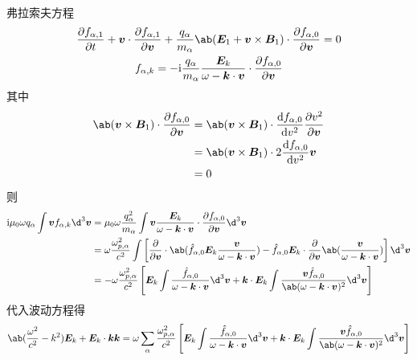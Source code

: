 弗拉索夫方程
\begin{equation}\begin{gathered}
\pdv{f_{\alpha,1}}{t}
+ \vec{v} \cdot \pdv{f_{\alpha,1}}{\vec{v}}
+ \frac{q_\alpha}{m_\alpha} \ab(\vec{E}_1 + \vec{v}\times\vec{B}_1)
\cdot \pdv{f_{\alpha,0}}{\vec{v}}
= 0 \\
f_{\alpha,k} = -\im \frac{q_\alpha}{m_\alpha}
\frac{\vec{E}_k}{\omega - \vec{k}\cdot\vec{v}}
\cdot \pdv{f_{\alpha,0}}{\vec{v}}
\end{gathered}\end{equation}
其中
\begin{equation}\begin{aligned}
\ab(\vec{v} \times \vec{B}_1) \cdot \pdv{f_{\alpha,0}}{\vec{v}}
&= \ab(\vec{v} \times \vec{B}_1)
\cdot \odv{f_{\alpha,0}}{v^2} \pdv{v^2}{\vec{v}} \\
&= \ab(\vec{v} \times \vec{B}_1)
\cdot 2 \odv{f_{\alpha,0}}{v^2} \vec{v} \\
&= 0
\end{aligned}\end{equation}
则
\begin{equation}\begin{aligned}
\im\mu_0\omega q_\alpha \int \vec{v} f_{\alpha,k} \d^3\vec{v}
&= \mu_0\omega \frac{q_\alpha^2}{m_\alpha}
\int \vec{v} \frac{\vec{E}_k}{\omega - \vec{k}\cdot\vec{v}}
\cdot \pdv{f_{\alpha,0}}{\vec{v}} \d^3\vec{v} \\
&= \omega \frac{\omega_{p,\alpha}^2}{c^2} \int \left[
\pdv{}{\vec{v}} \cdot \ab(
    \hat{f}_{\alpha,0} \vec{E}_k
    \frac{\vec{v}}{\omega - \vec{k}\cdot\vec{v}}
)
    - \hat{f}_{\alpha,0} \vec{E}_k \cdot
    \pdv*{\ab(\frac{\vec{v}}{\omega-\vec{k}\cdot\vec{v}})}{\vec{v}}
\right] \d^3\vec{v} \\
&= - \omega \frac{\omega_{p,\alpha}^2}{c^2} \left[
\vec{E}_k \int
\frac{\hat{f}_{\alpha,0}}{\omega - \vec{k}\cdot\vec{v}}
\d^3\vec{v}
+ \vec{k} \cdot \vec{E}_k \int
\frac{\vec{v} \hat{f}_{\alpha,0}}
{\ab(\omega - \vec{k}\cdot\vec{v})^2}
\d^3\vec{v}
\right]
\end{aligned}\end{equation}
代入波动方程得
\begin{equation}\begin{aligned}
\ab(\frac{\omega^2}{c^2} - k^2) \vec{E}_k
+ \vec{E}_k\cdot\vec{k}\vec{k}
= \omega \sum_\alpha \frac{\omega_{p,\alpha}^2}{c^2}
\left[
\vec{E}_k \int
\frac{\hat{f}_{\alpha,0}}{\omega - \vec{k}\cdot\vec{v}}
\d^3\vec{v}
+ \vec{k} \cdot \vec{E}_k \int
\frac{\vec{v} \hat{f}_{\alpha,0}}
{\ab(\omega - \vec{k}\cdot\vec{v})^2}
\d^3\vec{v}
\right]
\end{aligned}\end{equation}
